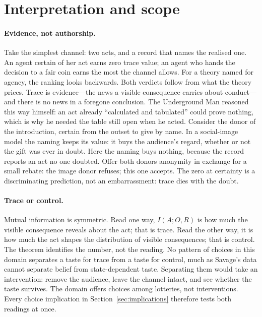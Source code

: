 \documentclass[11pt,a4paper]{article}
\theoremstyle{definition}
\newcommand{\I}{I}
\newcommand{\1}{\mathbf 1}
\begin{document}
\section{Interpretation and scope}\label{sec:interpretation}

\paragraph{Evidence, not authorship.}
Take the simplest channel: two acts, and a record that names the realised one.  An agent certain
of her act earns zero trace value; an agent who hands the decision to a fair coin earns the most
the channel allows.  For a theory named for agency, the ranking looks backwards.  Both verdicts
follow from what the theory prices.  Trace is evidence---the news a visible consequence carries
about conduct---and there is no news in a foregone conclusion.  The Underground Man reasoned this
way himself: an act already ``calculated and tabulated'' could prove nothing, which is why he
needed the table still open when he acted.  Consider the donor of the introduction, certain from
the outset to give by name.  In a social-image model \cite{BenabouTirole2006} the naming keeps its
value: it buys the audience's regard, whether or not the gift was ever in doubt.  Here the naming
buys nothing, because the record reports an act no one doubted.  Offer both donors anonymity in
exchange for a small rebate: the image donor refuses; this one accepts.  The zero at certainty is
a discriminating prediction, not an embarrassment: trace dies with the doubt.

\paragraph{Trace or control.}
Mutual information is symmetric.  Read one way, $\I(A;O,R)$ is how much the visible consequence
reveals about the act; that is trace.  Read the other way, it is how much the act shapes the
distribution of visible consequences; that is control.  The theorem identifies the number, not the
reading.  No pattern of choices in this domain separates a taste for trace from a taste for
control, much as Savage's data cannot separate belief from state-dependent taste.  Separating them
would take an intervention: remove the audience, leave the channel intact, and see whether the
taste survives.  The domain offers choices among lotteries, not interventions.  Every choice
implication in Section~\ref{sec:implications} therefore tests both readings at once.
\end{document}
